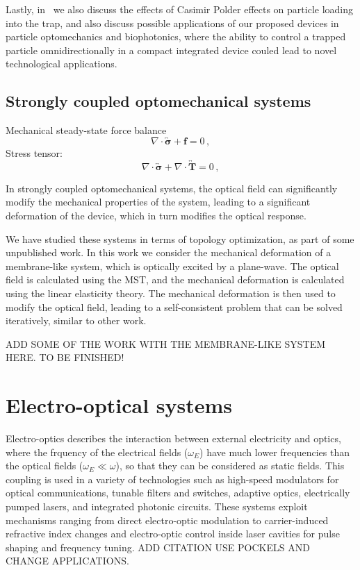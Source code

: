 Lastly, in~\cite{ownpub2} we also discuss the effects of Casimir Polder effects on particle loading into the trap, and
also discuss possible applications of our proposed devices in particle optomechanics and
biophotonics, where the ability to control a trapped particle omnidirectionally in a compact integrated device
couled lead to novel technological applications.

\subsection*{Strongly coupled optomechanical systems}

Mechanical steady-state force balance
\begin{equation}
    \nabla \cdot \overleftrightarrow{\boldsymbol{\sigma}} + \mathbf{f} = 0\,,
\end{equation}
Stress tensor:
\begin{equation}
    \nabla \cdot \overleftrightarrow{\boldsymbol{\sigma}} + \nabla \cdot \overleftrightarrow{\mathbf{T}} = 0\,,
\end{equation}

In strongly coupled optomechanical systems, the optical field can significantly modify the mechanical properties of the system, leading to a significant deformation
of the device, which in turn modifies the optical response. 

We have studied these systems in terms of topology optimization, as part of some unpublished work. In this work we consider 
the mechanical deformation of a membrane-like system, which is optically excited by a plane-wave. The optical field is calculated using the MST,
and the mechanical deformation is calculated using the linear elasticity theory. The mechanical deformation is then used to modify the optical field, 
leading to a self-consistent problem that can be solved iteratively, similar to other work.

ADD SOME OF THE WORK WITH THE MEMBRANE-LIKE SYSTEM HERE. TO BE FINISHED!


\section{Electro-optical systems~\cite{ownpub4}}

Electro-optics describes the interaction between external electricity and optics, where the frquency of the electrical fields ($\omega_E$)
have much lower frequencies than the optical fields ($\omega_E \ll \omega $), so that they can be considered as static fields.
This coupling is used in a variety of technologies such as high-speed modulators for optical communications, 
tunable filters and switches, adaptive optics, electrically pumped lasers, and integrated photonic circuits. 
These systems exploit mechanisms ranging from direct electro-optic modulation to carrier-induced refractive index
 changes and electro-optic control inside laser cavities for pulse shaping and frequency tuning. ADD CITATION USE POCKELS AND CHANGE
 APPLICATIONS.

